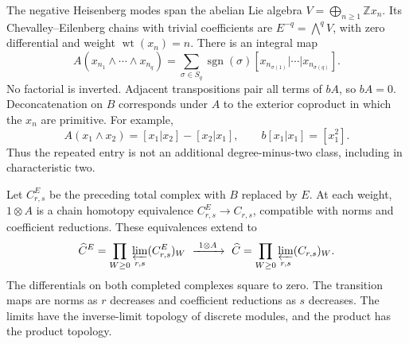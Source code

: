 The negative Heisenberg modes span the abelian Lie algebra
\(V=\bigoplus_{n\geq1}\mathbb Zx_n\). Its Chevalley--Eilenberg
chains with trivial coefficients are
\(E^{-q}=\bigwedge^q V\), with zero differential and weight
\(\operatorname{wt}(x_n)=n\). There is an integral map
\begin{equation}\label{v4-arith:C2:antisymmetrization}
 A(x_{n_1}\wedge\cdots\wedge x_{n_q})
 =\sum_{\sigma\in S_q}\operatorname{sgn}(\sigma)
 [x_{n_{\sigma(1)}}|\cdots|x_{n_{\sigma(q)}}].
\end{equation}
No factorial is inverted. Adjacent transpositions pair all terms
of \(bA\), so \(bA=0\). Deconcatenation on \(B\) corresponds under
\(A\) to the exterior coproduct in which the \(x_n\) are primitive.
For example,
\[
 A(x_1\wedge x_2)=[x_1|x_2]-[x_2|x_1],\qquad
 b[x_1|x_1]=[x_1^2].
\]
Thus the repeated entry is not an additional degree-minus-two
class, including in characteristic two.

\begin{theorem}
\label{v4-arith:pos-costello:thm:C2-strict-model}
Let \(C^E_{r,s}\) be the preceding total complex with \(B\) replaced
by \(E\). At each weight, \(1\otimes A\) is a chain homotopy
equivalence \(C^E_{r,s}\to C_{r,s}\), compatible with norms and
coefficient reductions. These equivalences extend to
\[
 \widehat C^E=\prod_{W\geq0}\varprojlim_{r,s}(C^E_{r,s})_W
 \ \xrightarrow{\ 1\otimes A\ }\
 \widehat C=\prod_{W\geq0}\varprojlim_{r,s}(C_{r,s})_W.
\]
The differentials on both completed complexes square to zero.
The transition maps are norms as \(r\) decreases and coefficient
reductions as \(s\) decreases. The limits have the inverse-limit topology of discrete modules,
and the product has the product topology.
\end{theorem}

